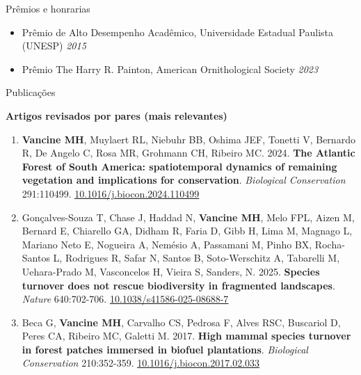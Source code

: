 \documentclass{resume}
\begin{document}
\begin{rSection}{Prêmios e honrarias} 
\begin{itemize}
\item {Prêmio de Alto Desempenho Acadêmico, Universidade Estadual Paulista (UNESP)} \hfill{\em 2015}
\item {Prêmio The Harry R. Painton, American Ornithological Society} \hfill{\em 2023}
\end{itemize}
\end{rSection}


\begin{rSection}{Publicações}

{\bf Artigos revisados por pares (mais relevantes)}

\begin{enumerate} 

\item {\bf Vancine MH}, Muylaert RL, Niebuhr BB, Oshima JEF, Tonetti V, Bernardo R, De Angelo C, Rosa MR, Grohmann CH, Ribeiro MC. 2024. {\bf The Atlantic Forest of South America: spatiotemporal dynamics of remaining vegetation and implications for conservation}. {\it Biological Conservation} 291:110499. \href{https://doi.org/10.1016/j.biocon.2024.110499}{\underline{10.1016/j.biocon.2024.110499}}

\item Gonçalves-Souza T, Chase J, Haddad N, {\bf Vancine MH}, Melo FPL, Aizen M, Bernard E, Chiarello GA, Didham R, Faria D, Gibb H, Lima M, Magnago L, Mariano Neto E, Nogueira A, Nemésio A, Passamani M, Pinho BX, Rocha-Santos L, Rodrigues R, Safar N, Santos B, Soto-Werschitz A, Tabarelli M, Uehara-Prado M, Vasconcelos H, Vieira S, Sanders, N. 2025. {\bf Species turnover does not rescue biodiversity in fragmented landscapes}. {\it Nature} 640:702-706. \href{https://doi.org/10.1038/s41586-025-08688-7}{\underline{10.1038/s41586-025-08688-7}}

\item Beca G, {\bf Vancine MH}, Carvalho CS, Pedrosa F, Alves RSC, Buscariol D, Peres CA, Ribeiro MC, Galetti M. 2017. {\bf High mammal species turnover in forest patches immersed in biofuel plantations}. {\it Biological Conservation} 210:352-359. \href{https://doi.org/10.1016/j.biocon.2017.02.033}{\underline{10.1016/j.biocon.2017.02.033}}

\end{enumerate} 


\end{rSection}
\end{document}
